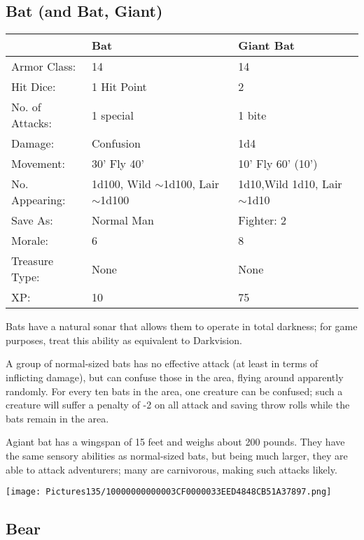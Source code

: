 \documentclass[a4paper,twoside,openany,10pt]{book}
\begin{document}
\begin{multicols}{2}
\subsection*{Bat (and Bat, Giant)}\label{bat-and-bat-giant}


\begin{flushleft}
	\begin{tabularx}{0.48\textwidth}{lXX}
& Bat & Giant Bat \\\hline
Armor Class: & 14 & 14 \\\hline
Hit Dice: & 1 Hit Point & 2 \\\hline
No. of Attacks: & 1 special & 1 bite \\\hline
Damage: & Confusion & 1d4 \\\hline
Movement: & 30' Fly 40' &10' Fly 60' (10') \\\hline
No. Appearing: & 1d100, Wild $\sim$1d100, Lair $\sim$1d100 & 1d10,Wild 1d10, Lair $\sim$1d10 \\\hline
Save As: & Normal Man & Fighter: 2 \\\hline
Morale: & 6 & 8 \\\hline
Treasure Type: & None & None \\\hline
XP: & 10 & 75 \\\hline
\end{tabularx}\medskip
\end{flushleft}

Bats have a natural sonar that allows them to operate in total darkness; for game purposes, treat this ability as equivalent to Darkvision.

A group of normal-sized bats has no effective attack (at least in terms of inflicting damage), but can confuse those in the area, flying around apparently randomly. For every ten bats in the area, one creature can be confused; such a creature will suffer a penalty of -2 on all attack and saving throw rolls while the bats remain in the area.

Agiant bat has a wingspan of 15 feet and weighs about 200 pounds. They have the same sensory abilities as normal-sized bats, but being much larger, they are able to attack adventurers; many are carnivorous, making such attacks likely.

\begin{center}
	\texttt{[image: Pictures135/10000000000003CF0000033EED4848CB51A37897.png]}
\end{center}


\subsection*{Bear}\label{bear}


\end{multicols}
\end{document}
